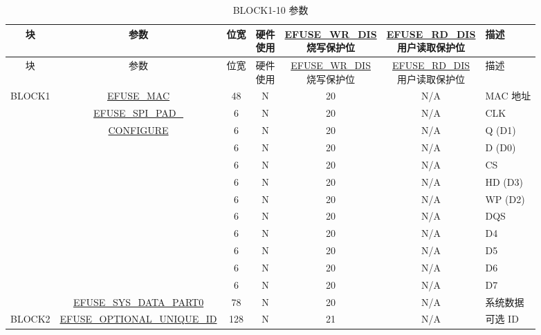 \begin{longtable}[l]{ |c|c|c|c|c|c|l| }
    \caption{BLOCK1-10 参数}
    \label{table:BLOCK1_10_Parameter}
    \\\hline
    \rowcolor{lightgray}
    块 & 参数 & 位宽 & \footnotesize\makecell[c]{硬件\\使用} &  \footnotesize\makecell[c]{\hyperref[fielddesc:EFUSEWRDIS]{EFUSE\_WR\_DIS} \\ 烧写保护位} &
   \footnotesize\makecell[c]{ \hyperref[fielddesc:EFUSERDDIS]{EFUSE\_RD\_DIS} \\ 用户读取保护位} &
    描述 \\
    \endfirsthead
    \hline
    \rowcolor{lightgray}
    块 & 参数 & 位宽 & \footnotesize\makecell[c]{硬件\\使用} & \footnotesize\makecell[c]{\hyperref[fielddesc:EFUSEWRDIS]{EFUSE\_WR\_DIS} \\ 烧写保护位} &
   \footnotesize\makecell[c]{ \hyperref[fielddesc:EFUSERDDIS]{EFUSE\_RD\_DIS} \\ 用户读取保护位} &
    描述 \\\hline
    \endhead
    \endfoot
    \endlastfoot
    \hline
    BLOCK1 & \hyperref[fielddesc:EFUSEMAC0]{EFUSE\_MAC} & 48 & N & 20 & N/A & MAC 地址 \\\cline{2-7}
    & \hyperref[fielddesc:EFUSESPIPADCONF0]{EFUSE\_SPI\_PAD\_}& 6 & N & 20 & N/A & {CLK} \\
    \cline{3-7}
    & \hyperref[fielddesc:EFUSESPIPADCONF0]{CONFIGURE} & 6 & N & 20 & N/A & Q (D1) \\
    \cline{3-7}
    & & 6 & N & 20 & N/A & D (D0) \\
    \cline{3-7}
    & & 6 & N & 20 & N/A & CS\\
    \cline{3-7}
    & & 6 & N & 20 & N/A & HD (D3) \\
    \cline{3-7}
    & & 6 & N & 20 & N/A & WP (D2) \\
    \cline{3-7}
    & & 6 & N & 20 & N/A & DQS \\
    \cline{3-7}
    & & 6 & N & 20 & N/A & D4 \\
    \cline{3-7}
    & & 6 & N & 20 & N/A & D5 \\
    \cline{3-7}
    & & 6 & N & 20 & N/A & D6 \\
    \cline{3-7}
    & & 6 & N & 20 & N/A & D7 \\
    \cline{ 2-7 }
    & \hyperref[fielddesc:EFUSESYSDATAPART00]{EFUSE\_SYS\_DATA\_PART0} & 78 & N & 20 & N/A & 系统数据 \\\hline		
    BLOCK2 & \hyperref[fielddesc:EFUSEOPTIONALUNIQUEID]{EFUSE\_OPTIONAL\_UNIQUE\_ID} & 128 & N & 21 & N/A & 可选 ID \\\cline{2-7}

\end{longtable}
